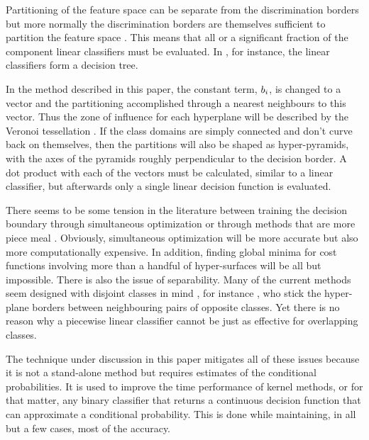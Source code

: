 Partitioning of the feature space can be separate from the discrimination 
borders \citep{Huang_etal2013} but more normally the discrimination borders 
are themselves sufficient to partition the feature space 
\citep{Osborne1977,Lee_Richards1984,Bagirov2005,Kostin2006}.
This means that all or a significant fraction of the component
linear classifiers must be evaluated.
In \citet{Kostin2006}, for instance, the linear classifiers form a decision
tree.

In the method described in this paper, the constant term, $b_i$,
is changed to a vector and the partitioning accomplished through a nearest
neighbours to this vector. 
Thus the zone of influence for each hyperplane
will be described by the Veronoi tessellation \citep{Kohonen2000}.
If the class domains are simply connected and don't curve back on themselves, 
then the partitions will also be shaped as hyper-pyramids, 
with the axes of the pyramids roughly perpendicular to the decision border.
A dot product with each of the vectors must be calculated, similar
to a linear classifier, but afterwards only a single linear decision function is
evaluated.

There seems to be some tension in the literature between training the
decision boundary through simultaneous optimization \citep{Bagirov2005,Wang_Saligrama2013} or through
methods that are more piece meal \citep{Gai_Zhang2010,Herman_Yeung1992,Kostin2006}.
Obviously, simultaneous optimization will be more accurate but also more computationally expensive.
In addition, finding global minima for cost functions 
involving more than a handful of hyper-surfaces will be all but impossible.
There is also the issue of separability. Many of the current 
methods seem designed with disjoint classes in mind \citep{Herman_Yeung1992}, for instance
\citet{Gai_Zhang2010}, who stick the hyper-plane borders between 
neighbouring pairs of opposite classes.
Yet there is no reason why a piecewise linear classifier cannot be just as
effective for overlapping classes.

The technique under discussion in this paper mitigates all of these issues 
because it is not a stand-alone method but requires estimates
of the conditional probabilities.
It is used to improve the time performance of kernel methods, or for that matter,
any binary classifier that returns a continuous decision function 
that can approximate a conditional probability.
This is done while maintaining, in all but a few cases, most of the accuracy.


